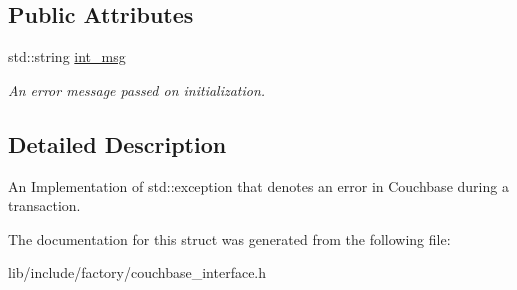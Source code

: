\subsection*{Public Attributes}
\begin{DoxyCompactItemize}
\item 
\hypertarget{structCouchbaseOperationException_add2d35913e6d8a991522a6a12fd224d2}{std\-::string \hyperlink{structCouchbaseOperationException_add2d35913e6d8a991522a6a12fd224d2}{int\-\_\-msg}}\label{structCouchbaseOperationException_add2d35913e6d8a991522a6a12fd224d2}

\begin{DoxyCompactList}\small\item\em An error message passed on initialization. \end{DoxyCompactList}\end{DoxyCompactItemize}


\subsection{Detailed Description}
An Implementation of std\-::exception that denotes an error in Couchbase during a transaction. 

The documentation for this struct was generated from the following file\-:\begin{DoxyCompactItemize}
\item 
lib/include/factory/couchbase\-\_\-interface.\-h\end{DoxyCompactItemize}
